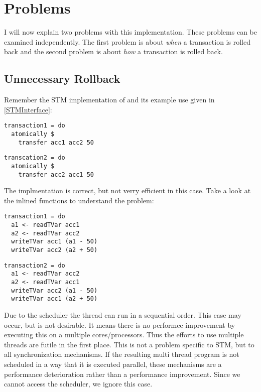 \section{Problems}
I will now explain two problems with this implementation. These problems can be examined independently. The first problem is about
\textit{when} a transaction is rolled back and the second problem is about \textit{how} a transaction is rolled back.

\subsection{Unnecessary Rollback}
\label{Prob:UnRo}
Remember the STM implementation of  and its example use given in \ref{STMInterface}: 
\par\noindent
\begin{minipage}[t]{.45\textwidth}
\begin{lstlisting}[frame=lrtb]
transaction1 = do
  atomically $
    transfer acc1 acc2 50
\end{lstlisting}
\end{minipage}
\hfill
\begin{minipage}[t]{.45\textwidth}
\begin{lstlisting}[frame=lrtb]
transcation2 = do 
  atomically $ 
    transfer acc2 acc1 50
\end{lstlisting}
\end{minipage}
The implmentation is correct, but not verry efficient in this case. Take a look at the inlined functions to understand the 
problem:
\par\noindent
\begin{minipage}[t]{.45\textwidth}
\begin{lstlisting}[frame=lrtb]
transaction1 = do
  a1 <- readTVar acc1
  a2 <- readTVar acc2
  writeTVar acc1 (a1 - 50)
  writeTVar acc2 (a2 + 50)
\end{lstlisting}
\end{minipage}
\hfill
\begin{minipage}[t]{.45\textwidth}
\begin{lstlisting}[frame=lrtb]
transaction2 = do 
  a1 <- readTVar acc2
  a2 <- readTVar acc1
  writeTVar acc2 (a1 - 50)
  writeTVar acc1 (a2 + 50)
\end{lstlisting}
\end{minipage}

Due to the scheduler the thread can run in a sequential order. This case may occur, but is not desirable. It means 
there is no performce improvement by executing this on a multiple cores/processors. Thus the efforts to use multiple
threads are futile in the first place. This is not a problem specific to STM, but to all synchronization mechanisms. 
If the resulting multi thread program is not scheduled in a way that it is executed parallel, these mechanisms are a
performance deterioration rather than a performance improvement. Since we cannot access the scheduler, we ignore 
this case. 

